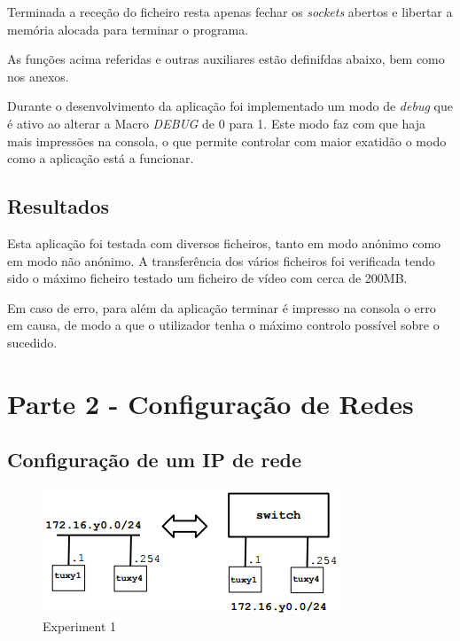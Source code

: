 \documentclass[a4paper]{article}
\begin{document}
	Terminada a receção do ficheiro resta apenas fechar os \textit{sockets} abertos e libertar a memória alocada para terminar o programa.

	As funções acima referidas e outras auxiliares estão definifdas abaixo, bem como nos anexos.

	
	\normalsize
	
	Durante o desenvolvimento da aplicação foi implementado um modo de \textit{debug} que é ativo ao alterar a Macro \textit{DEBUG} de 0 para 1. Este modo faz com que haja mais impressões na consola, o que permite controlar com maior exatidão o modo como a aplicação está a funcionar.

	
	\normalsize

	\subsection{Resultados}

	Esta aplicação foi testada com diversos ficheiros, tanto em modo anónimo como em modo não anónimo. A transferência dos vários ficheiros foi verificada tendo sido o máximo ficheiro testado um ficheiro de vídeo com cerca de 200MB.

	Em caso de erro, para além da aplicação terminar é impresso na consola o erro em causa, de modo a que o utilizador tenha o máximo controlo possível sobre o sucedido.

	\section{Parte 2 - Configuração de Redes}
	
	\subsection{Configuração de um IP de rede}

	\begin{figure}[H]
	\begin{center}
  	\includegraphics[width=0.45\linewidth]{exp1.png}
  	\caption{Experiment 1}
  	\label{fig:Experiment 1}
	\end{center}
	\end{figure}
\end{document}

